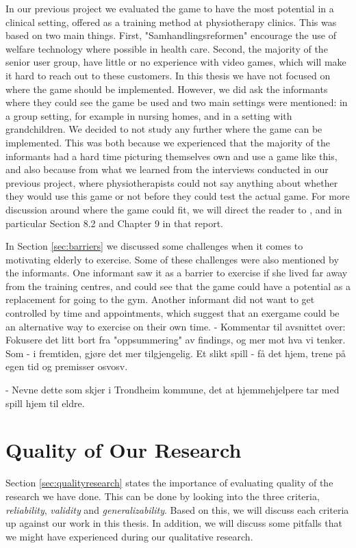 In our previous project \cite{project} we evaluated the game to have the most potential in a clinical setting, offered as a training method at physiotherapy clinics. This was based on two main things. First, "Samhandlingsreformen" encourage the use of welfare technology where possible in health care. Second, the majority of the senior user group, have little or no experience with video games, which will make it hard to reach out to these customers. In this thesis we have not focused on where the game should be implemented. However, we did ask the informants where they could see the game be used and two main settings were mentioned: in a group setting, for example in nursing homes, and in a setting with grandchildren. We decided to not study any further where the game can be implemented. This was both because we experienced that the majority of the informants had a hard time picturing themselves own and use a game like this, and also because from what we learned from the interviews conducted in our previous project, where physiotherapists could not say anything about whether they would use this game or not before they could test the actual game. For more discussion around where the game could fit, we will direct the reader to \cite{project}, and in particular Section 8.2 and Chapter 9 in that report. 

In Section \ref{sec:barriers} we discussed some challenges when it comes to motivating elderly to exercise. Some of these challenges were also mentioned by the informants. One informant saw it as a barrier to exercise if she lived far away from the training centres, and could see that the game could have a potential as a replacement for going to the gym. Another informant did not want to get controlled by time and appointments, which suggest that an exergame could be an alternative way to exercise on their own time. 
- Kommentar til avsnittet over: Fokusere det litt bort fra "oppsummering" av findings, og mer mot hva vi tenker. Som - i fremtiden, gjøre det mer tilgjengelig. Et slikt spill - få det hjem, trene på egen tid og premisser osvosv. 


- Nevne dette som skjer i Trondheim kommune, det at hjemmehjelpere tar med spill hjem til eldre. 
\section{Quality of Our Research}
\label{sec:qualityofresearch}

Section \ref{sec:qualityresearch} states the importance of evaluating quality of the research we have done. This can be done by looking into the three criteria, \emph{reliability}, \emph{validity} and \emph{generalizability}. Based on this, we will discuss each criteria up against our work in this thesis. In addition, we will discuss some pitfalls that we might have experienced during our qualitative research.  

